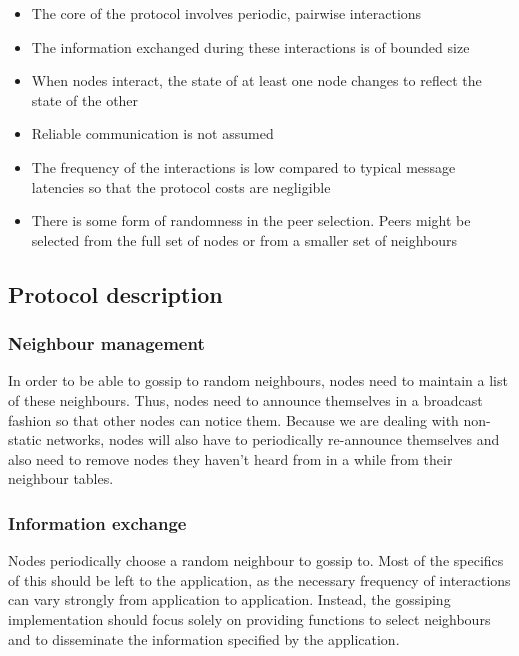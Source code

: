 \documentclass[11pt,
  a4paper,
  ngerman,
  BCOR=7mm
]{scrartcl}
\begin{document}
\begin{itemize}
  \item The core of the protocol involves periodic, pairwise
    interactions
  \item The information exchanged during these interactions is of
    bounded size
  \item When nodes interact, the state of at least one node changes to
    reflect the state of the other
  \item Reliable communication is not assumed
  \item The frequency of the interactions is low compared to typical
    message latencies so that the protocol costs are negligible
  \item There is some form of randomness in the peer selection. Peers
    might be selected from the full set of nodes or from a smaller set
    of neighbours
\end{itemize}

\subsection*{Protocol description}
\label{sub:protocol_gossiping}

\subsubsection*{Neighbour management}
\label{ssub:Neighbour_management}
In order to be able to gossip to random neighbours, nodes need to
maintain a list of these neighbours. Thus, nodes need to announce
themselves in a broadcast fashion so that other nodes can notice them.
Because we are dealing with non-static networks, nodes will also have to
periodically re-announce themselves and also need to remove nodes they
haven't heard from in a while from their neighbour tables.

\subsubsection*{Information exchange}
\label{ssub:Information_exchange}
Nodes periodically choose a random neighbour to gossip to. Most of the
specifics of this should be left to the application, as the necessary
frequency of interactions can vary strongly from application to
application. Instead, the gossiping implementation should focus solely
on providing functions to select neighbours and to disseminate the
information specified by the application.
\end{document}

